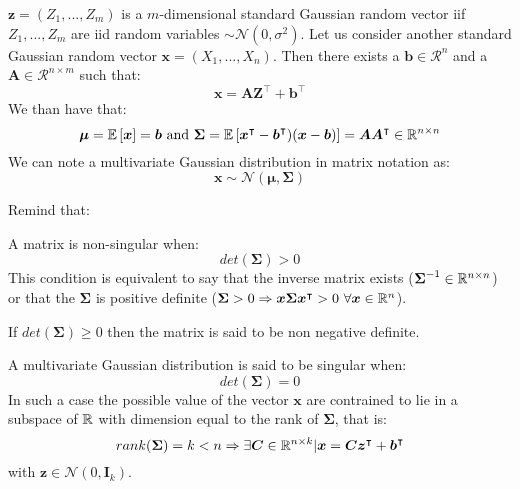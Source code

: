 \begin{definition}
    $\boldsymbol{z}=(Z_1, ...,Z_m)$ is a $m$-dimensional standard Gaussian random vector iif $Z_1, ...,Z_m$ are iid random variables $\sim\mathcal{N}(0, \sigma^2)$.
    Let us consider another standard Gaussian random vector $\boldsymbol{x}=(X_1, ...,X_n)$. Then there exists a $\boldsymbol{b}\in\mathcal{R}^n$ and a $\boldsymbol{A}\in\mathcal{R}^{n\times m}$ such that:
    \[
        \boldsymbol{x}=\boldsymbol{A}\boldsymbol{Z}^\intercal+\boldsymbol{b}^\intercal
    \]
    We than have that:
    \begin{equation*}
        \boldsymbol{\mu}=\mathbb{E}\left[\boldsymbol{x}\right]=\boldsymbol{b} \text{ and } \boldsymbol{\Sigma}=\mathbb{E}\left[\boldsymbol{x}^\intercal -\boldsymbol{b}^\intercal)(\boldsymbol{x}-\boldsymbol{b})\right]=\boldsymbol{A}\boldsymbol{A}^\intercal\in\mathbb{R}^{n\times n}       
    \end{equation*}
    We can note a multivariate Gaussian distribution in matrix notation as:
    \[
        \boldsymbol{x}\sim\mathcal{N}(\boldsymbol{\mu},\boldsymbol{\Sigma})    
    \]
\end{definition}

Remind that:
\begin{definition}
    A matrix is non-singular when:
    \[
        det(\boldsymbol{\Sigma})>0 
    \]
    This condition is equivalent to say that the inverse matrix exists ($\boldsymbol{\Sigma}^{-1}\in\mathbb{R}^{n\times n}$) or that the $\boldsymbol{\Sigma}$ is positive definite ($\boldsymbol{\Sigma}>0 \Rightarrow \boldsymbol{x}\boldsymbol{\Sigma}\boldsymbol{x}^\intercal>0 \text{ } \forall \boldsymbol{x}\in\mathbb{R}^n$).
    
    If $det(\boldsymbol{\Sigma})\ge0$ then the matrix is said to be non negative definite.
\end{definition}

\begin{definition}
    A multivariate Gaussian distribution is said to be singular when:
    \[
        det(\boldsymbol{\Sigma})=0 
    \]
    In such a case the possible value of the vector $\boldsymbol{x}$ are contrained to lie in a subspace of $\mathbb{R}$ with dimension equal to the rank of $\boldsymbol{\Sigma}$, that is:
    \[
        rank(\boldsymbol{\Sigma})=k<n \Rightarrow\exists\boldsymbol{C}\in\mathbb{R}^{n\times k} | \boldsymbol{x}=\boldsymbol{C}\boldsymbol{z}^\intercal +\boldsymbol{b}^\intercal  
    \]
    with $\boldsymbol{z}\in\mathcal{N}(0,\boldsymbol{I}_k)$.
\end{definition}


